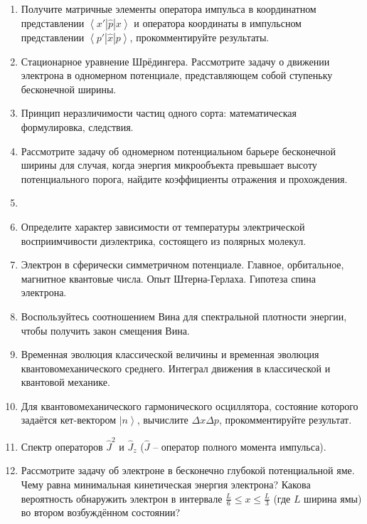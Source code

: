 \documentclass[12pt]{article}
\newcommand{\kL}[1]{\label{К-#1}}
\def\twodigits#1{%
\ifnum#1<10 0\fi 
\number#1}
\begin{document}
\begin{enumerate}[label={\textbf{К-\protect\twodigits{\theenumi}}}]
\item\kL{12}
Получите матричные элементы оператора импульса в координатном представлении $\left<x'|\hat{p}|x\right>$ и оператора координаты в импульсном представлении $\left<p'|\hat{x}|p\right>$, прокомментируйте результаты.

\item\kL{13}
Стационарное уравнение Шрёдингера. Рассмотрите задачу о движении электрона в одномерном потенциале, представляющем собой ступеньку бесконечной ширины.

\item\kL{14}
Принцип неразличимости частиц одного сорта: математическая формулировка, следствия.

\item\kL{15}
Рассмотрите задачу об одномерном потенциальном барьере бесконечной ширины для случая, когда энергия микрообъекта превышает высоту потенциального порога, найдите коэффициенты отражения и прохождения.

\item\kL{16}

\item\kL{17}
Определите характер зависимости от температуры электрической восприимчивости диэлектрика, состоящего из полярных молекул.

\item\kL{18}
Электрон в сферически симметричном потенциале. Главное, орбитальное, магнитное квантовые числа. Опыт Штерна-Герлаха. Гипотеза спина электрона.

\item\kL{19}
Воспользуйтесь соотношением Вина для спектральной плотности энергии, чтобы получить закон смещения Вина.

\item\kL{20}
Временная эволюция классической величины и временная эволюция квантовомеханического среднего. Интеграл движения в классической и квантовой механике.

\item\kL{21}
Для квантовомеханического гармонического осциллятора, состояние которого задаётся кет-вектором $\left|n\right>$, вычислите $\Delta x\Delta p$, прокомментируйте результат.

\item\kL{22}
 Спектр операторов $\hat{J}^2$ и $\hat{J}_z$ ($\hat{J}$ -- оператор полного момента импульса).

\item\kL{23}
Рассмотрите задачу об электроне в бесконечно глубокой потенциальной яме. Чему равна минимальная кинетическая энергия электрона? Какова вероятность обнаружить электрон в интервале $\frac{L}{6}\le x\le\frac{L}{3}$ (где $L$ ширина ямы) во втором возбуждённом состоянии?


\end{enumerate}
\end{document}
